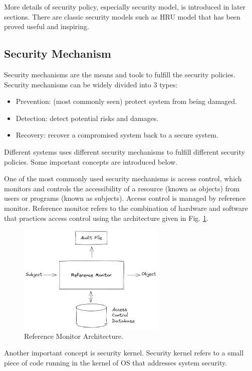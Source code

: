 More details of security policy, especially security model, is introduced in later sections. There are classic security models such as HRU model that has been proved useful and inspiring.

\subsection{Security Mechanism}

Security mechanisms are the means and tools to fulfill the security policies. Security mechanisms can be widely divided into 3 types:
\begin{itemize}
  \item Prevention: (most commonly seen) protect system from being damaged.
  \item Detection: detect potential risks and damages.
  \item Recovery: recover a compromised system back to a secure system.
\end{itemize}

Different systems uses different security mechanisms to fulfill different security policies. Some important concepts are introduced below.

One of the most commonly used security mechanisms is access control, which monitors and controls the accessibility of a resource (known as objects) from users or programs (known as subjects). Access control is managed by reference monitor. Reference monitor refers to the combination of hardware and software that practices access control using the architecture given in Fig. \ref{ch:ossec:fig:reference_monitor}.

\begin{figure}[htbp]
	\centering
	\includegraphics[width=200pt]{chapters/part-4/figures/reference_monitor.png}
	\caption{Reference Monitor Architecture.} \label{ch:ossec:fig:reference_monitor}
\end{figure}

Another important concept is security kernel. Security kernel refers to a small piece of code running in the kernel of OS that addresses system security.

